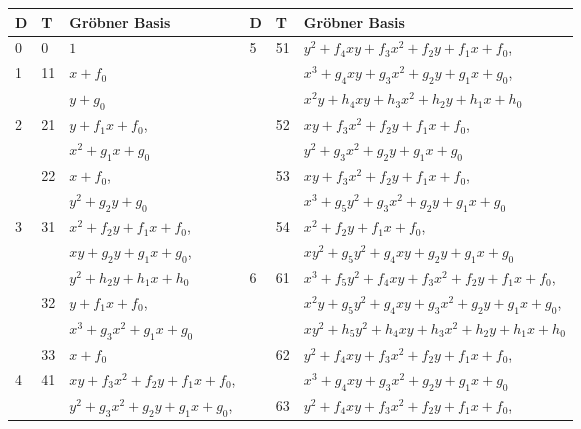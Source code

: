 \begin{table}[hb]
\label{tab_divisor_types}
\begin{center}
\begin{tabular}{l|l|l||l|l|l}
  D & T & Gr\"obner Basis & D & T & Gr\"obner Basis \\
  \hline
  0 & 0 & $1$ & \multirow{9}{*}{5} &\multirow{3}{*}{51} & $y^2 + f_4xy + f_3x^2 + f_2y + f_1x + f_0$, \\
  \cline{1-3}
  \multirow{2}{*}{1} &\multirow{2}{*}{11} & $x + f_0$ & & & $x^3 + g_4xy + g_3x^2 + g_2y + g_1x + g_0$, \\
    & & $y + g_0$ & & & $x^2y + h_4xy + h_3x^2 + h_2y + h_1x + h_0$ \\
  \cline{1-3}\cline{5-6}
  \multirow{4}{*}{2} &\multirow{2}{*}{21} & $y + f_1x + f_0$, & & \multirow{2}{*}{52} & $xy + f_3x^2 + f_2y + f_1x + f_0$, \\
    & & $x^2 + g_1x + g_0$ & & & $y^2 + g_3x^2 + g_2y + g_1x + g_0$ \\
    \cline{2-3}\cline{5-6}
    &\multirow{2}{*}{22}  & $x + f_0$, & & \multirow{2}{*}{53} & $xy + f_3x^2 + f_2y + f_1x + f_0$, \\
    & & $y^2 + g_2y + g_0$ & & & $x^3 + g_5y^2 + g_3x^2 + g_2y + g_1x + g_0$ \\
  \cline{1-3}\cline{5-6}
  \multirow{6}{*}{3} &\multirow{3}{*}{31} & $x^2 + f_2y + f_1x + f_0$, & & \multirow{2}{*}{54} & $x^2 + f_2y + f_1x + f_0$, \\
    & & $xy + g_2y + g_1x + g_0$, & & & $xy^2 + g_5y^2 + g_4xy + g_2y + g_1x + g_0$ \\
  \cline{4-6}
    & & $y^2 + h_2y + h_1x + h_0$ & \multirow{10}{*}{6} &\multirow{3}{*}{61} & $x^3 + f_5y^2 + f_4xy + f_3x^2 + f_2y + f_1x + f_0$, \\
    \cline{2-3}
    &\multirow{2}{*}{32} & $y + f_1x + f_0$, & & & $x^2y + g_5y^2 + g_4xy + g_3x^2 + g_2y + g_1x + g_0$, \\
    & & $x^3 + g_3x^2 + g_1x + g_0$ & & & $xy^2 + h_5y^2 + h_4xy + h_3x^2 + h_2y + h_1x + h_0$ \\
    \cline{2-3}\cline{5-6}
    &\multirow{1}{*}{33} & $x + f_0$ & &\multirow{2}{*}{62} & $y^2 + f_4xy + f_3x^2 + f_2y + f_1x + f_0$, \\
  \cline{1-3}
  \multirow{8}{*}{4} &\multirow{3}{*}{41} & $xy + f_3x^2 + f_2y + f_1x + f_0$, & & & $x^3 + g_4xy + g_3x^2 + g_2y + g_1x + g_0$ \\
  \cline{5-6}
    & & $y^2 + g_3x^2 + g_2y + g_1x + g_0$, & &\multirow{2}{*}{63} & $y^2 + f_4xy + f_3x^2 + f_2y + f_1x + f_0$, \\

\end{tabular}
\end{center}
\end{table}
